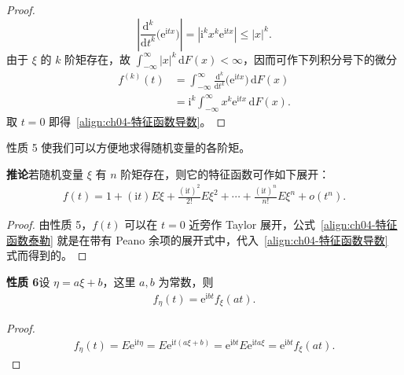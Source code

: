 \documentclass[../../main.tex]{subfiles}
\begin{document}
\begin{proof}
\[
\left|\frac{\mathrm{d}^k}{\mathrm{d}t^k}\bigl(\mathrm{e}^{\mathrm{i}tx}\bigr)\right|
=\left|\mathrm{i}^k x^k\mathrm{e}^{\mathrm{i}tx}\right|\leqslant|x|^k.
\]
由于 $\xi$ 的 $k$ 阶矩存在，故 $\int_{-\infty}^{\infty}|x|^k\,\mathrm{d}F(x)<\infty$，因而可作下列积分号下的微分
\begin{align*}
f^{(k)}(t)&=\int_{-\infty}^{\infty}\frac{\mathrm{d}^k}{\mathrm{d}t^k}\bigl(\mathrm{e}^{\mathrm{i}tx}\bigr)\,\mathrm{d}F(x)\\
&=\mathrm{i}^k\int_{-\infty}^{\infty}x^k\mathrm{e}^{\mathrm{i}tx}\,\mathrm{d}F(x).
\end{align*}
取 $t=0$ 即得~\eqref{align:ch04-特征函数导数}。
\end{proof}

性质 5 使我们可以方便地求得随机变量的各阶矩。

\noindent\textbf{推论}\quad 若随机变量 $\xi$ 有 $n$ 阶矩存在，则它的特征函数可作如下展开：
\begin{align}
f(t)=1+(\mathrm{i}t)E\xi+\frac{(\mathrm{i}t)^2}{2!}E\xi^2+\cdots+\frac{(\mathrm{i}t)^n}{n!}E\xi^n+o(t^n).\label{align:ch04-特征函数泰勒}
\end{align}

\begin{proof}
由性质 5，$f(t)$ 可以在 $t=0$ 近旁作 Taylor 展开，公式~\eqref{align:ch04-特征函数泰勒} 就是在带有 Peano 余项的展开式中，代入~\eqref{align:ch04-特征函数导数} 式而得到的。
\end{proof}

\noindent\textbf{性质 6}\quad 设 $\eta=a\xi+b$，这里 $a,b$ 为常数，则
\begin{align}
f_\eta(t)=\mathrm{e}^{\mathrm{i}bt}f_\xi(at).\label{align:ch04-线性变换特征函数}
\end{align}

\begin{proof}
\begin{align*}
f_\eta(t)=E\mathrm{e}^{\mathrm{i}t\eta}=E\mathrm{e}^{\mathrm{i}t(a\xi+b)}
=\mathrm{e}^{\mathrm{i}bt}E\mathrm{e}^{\mathrm{i}ta\xi}=\mathrm{e}^{\mathrm{i}bt}f_\xi(at).
\end{align*}
\end{proof}
\end{document}
